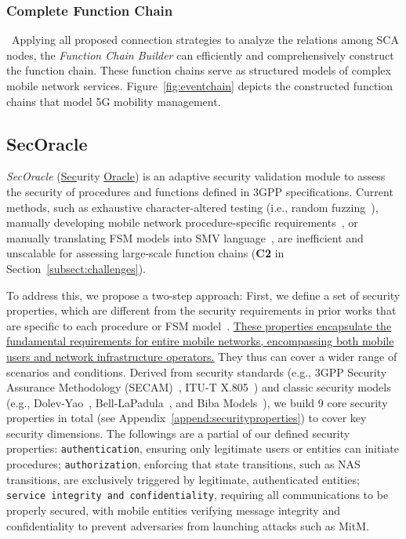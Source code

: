 \documentclass[sigconf]{acmart}
\begin{document}
{\subsubsection{Complete Function Chain}~Applying all proposed connection strategies to analyze the relations among SCA nodes, the \textit{Function Chain Builder} can efficiently and comprehensively construct the function chain. 
These function chains serve as structured models of complex mobile network services. Figure~\ref{fig:eventchain} depicts the constructed function chains that model 5G mobility management.   

\subsection{SecOracle}
\label{subsect:secoracle}

\textit{SecOracle} (\ul{Sec}urity \ul{Oracle}) is an adaptive security validation module to assess the security of procedures and functions defined in 3GPP specifications. Current methods, such as exhaustive character-altered testing (i.e., random fuzzing~\cite{godefroid2020fuzzing}), manually developing mobile network procedure-specific requirements~\cite{chen2023sherlock,al2024hermes}, or manually translating FSM models into SMV language~\cite{clarke1996symbolic,al2024hermes,hussain20195greasoner,hussain2018lteinspector}, are inefficient and unscalable for assessing large-scale function chains (\textbf{C2} in Section~\ref{subsect:challenges}). 

To address this, we propose a two-step approach: 
First, we define a set of security properties, which are different from the security requirements in prior works that are specific to each procedure or FSM model~\cite{chen2023sherlock,al2024hermes}. \ul{These properties encapsulate the fundamental requirements for entire mobile networks, encompassing both mobile users and network infrastructure operators.} They thus can cover a wider range of scenarios and conditions. 
Derived from security standards (e.g., 3GPP Security Assurance Methodology (SECAM)~\cite{3gppTR33916v16}, ITU-T X.805~\cite{ituTX805}) and classic security models (e.g., Dolev-Yao~\cite{dolev2003security}, Bell-LaPadula~\cite{lapadula1996secure}, and Biba Models~\cite{Biba}), we build 9 core security properties in total (see Appendix~\ref{append:securityproperties}) to cover key security dimensions. The followings are a partial of our defined security properties: \texttt{authentication}, ensuring only legitimate users or entities can initiate procedures; \texttt{authorization}, enforcing that state transitions, such as NAS transitions, are exclusively triggered by legitimate, authenticated entities; \texttt{service integrity and confidentiality}, requiring all communications to be properly secured, with mobile entities verifying message integrity and confidentiality to prevent adversaries from launching attacks such as MitM. 

}
\end{document}
